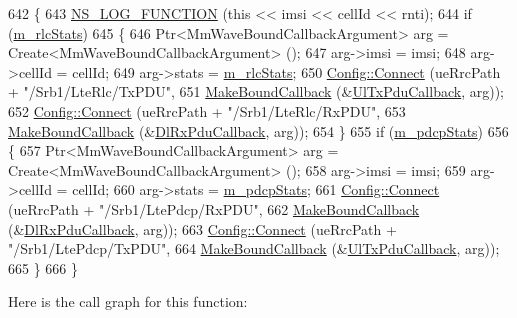 \begin{DoxyCode}
642 \{
643   \hyperlink{log-macros-disabled_8h_a90b90d5bad1f39cb1b64923ea94c0761}{NS\_LOG\_FUNCTION} (\textcolor{keyword}{this} << imsi << cellId << rnti);
644    \textcolor{keywordflow}{if} (\hyperlink{classns3_1_1MmWaveBearerStatsConnector_a3613ebbbe92cd828e66b03c91c7ebcbb}{m\_rlcStats})
645     \{
646       Ptr<MmWaveBoundCallbackArgument> arg = Create<MmWaveBoundCallbackArgument> ();
647       arg->imsi = imsi;
648       arg->cellId = cellId; 
649       arg->stats = \hyperlink{classns3_1_1MmWaveBearerStatsConnector_a3613ebbbe92cd828e66b03c91c7ebcbb}{m\_rlcStats};
650       \hyperlink{group__config_ga4014f151241cd0939b6cb64409605736}{Config::Connect} (ueRrcPath + \textcolor{stringliteral}{"/Srb1/LteRlc/TxPDU"},
651                        \hyperlink{group__makeboundcallback_ga1725d6362e6065faa0709f7c93f8d770}{MakeBoundCallback} (&\hyperlink{namespacens3_ae624428f0992ac62a3c5f2e7318fb98e}{UlTxPduCallback}, arg));
652       \hyperlink{group__config_ga4014f151241cd0939b6cb64409605736}{Config::Connect} (ueRrcPath + \textcolor{stringliteral}{"/Srb1/LteRlc/RxPDU"},
653                        \hyperlink{group__makeboundcallback_ga1725d6362e6065faa0709f7c93f8d770}{MakeBoundCallback} (&\hyperlink{namespacens3_ae4fb5123d8a56fce742428b530ec4197}{DlRxPduCallback}, arg));
654     \}
655   \textcolor{keywordflow}{if} (\hyperlink{classns3_1_1MmWaveBearerStatsConnector_a6523c73cc057ed84faa3ddfc944ff67f}{m\_pdcpStats})
656     \{
657       Ptr<MmWaveBoundCallbackArgument> arg = Create<MmWaveBoundCallbackArgument> ();
658       arg->imsi = imsi;
659       arg->cellId = cellId; 
660       arg->stats = \hyperlink{classns3_1_1MmWaveBearerStatsConnector_a6523c73cc057ed84faa3ddfc944ff67f}{m\_pdcpStats};
661       \hyperlink{group__config_ga4014f151241cd0939b6cb64409605736}{Config::Connect} (ueRrcPath + \textcolor{stringliteral}{"/Srb1/LtePdcp/RxPDU"},
662                        \hyperlink{group__makeboundcallback_ga1725d6362e6065faa0709f7c93f8d770}{MakeBoundCallback} (&\hyperlink{namespacens3_ae4fb5123d8a56fce742428b530ec4197}{DlRxPduCallback}, arg));
663       \hyperlink{group__config_ga4014f151241cd0939b6cb64409605736}{Config::Connect} (ueRrcPath + \textcolor{stringliteral}{"/Srb1/LtePdcp/TxPDU"},
664                        \hyperlink{group__makeboundcallback_ga1725d6362e6065faa0709f7c93f8d770}{MakeBoundCallback} (&\hyperlink{namespacens3_ae624428f0992ac62a3c5f2e7318fb98e}{UlTxPduCallback}, arg));
665     \}
666 \}
\end{DoxyCode}


Here is the call graph for this function\+:




